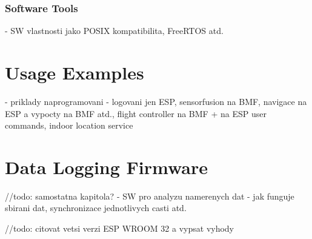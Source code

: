 \subsubsection{Software Tools}
- SW vlastnosti jako POSIX kompatibilita, FreeRTOS atd.



\section{Usage Examples}
- priklady naprogramovani - logovani jen ESP, sensorfusion na BMF, navigace na ESP a vypocty na BMF atd., flight controller na BMF + na ESP user commands, indoor location service

\section{Data Logging Firmware}
//todo: samostatna kapitola?
- SW pro analyzu namerenych dat
- jak funguje sbirani dat, synchronizace jednotlivych casti atd.

//todo: citovat vetsi verzi ESP WROOM 32 a vypsat vyhody
